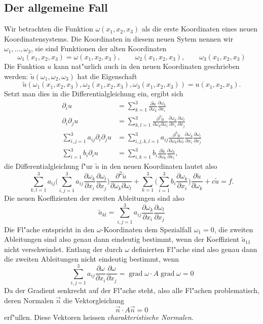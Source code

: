 \subsection{Der allgemeine Fall}
Wir betrachten die Funktion $\omega(x_1,x_2,x_3)$ als die erste
Koordinaten eines neuen Koordinatensystems. Die Koordinaten in diesem
neuen Sytem nennen wir $\omega_1,\dots,\omega_3$, sie sind Funktionen
der alten Koordinaten
\[
\omega_1(x_1,x_2,x_3)=\omega(x_1,x_2,x_3)
,\qquad
\omega_2(x_1,x_2,x_3)
,\qquad
\omega_3(x_1,x_2,x_3)
\]
Die Funktion $u$ kann nat"urlich auch in den neuen Koordinaten geschrieben
werden: $\tilde u(\omega_1,\omega_2,\omega_3)$ hat die Eigenschaft
\[
\tilde u(
\omega_1(x_1,x_2,x_3),
\omega_2(x_1,x_2,x_3),
\omega_3(x_1,x_2,x_3)) = u(x_1,x_2,x_3).
\]
Setzt man dies in die Differentialgleichung ein, ergibt sich
\begin{align*}
\partial_iu
&=
\sum_{k=1}^3
\frac{\partial\tilde u}{\partial \omega_k}
\frac{\partial\omega_k}{\partial x_i}
\\
\partial_i\partial_ju
&=
\sum_{k,l=1}^3
\frac{\partial^2\tilde u}{\partial \omega_k\partial\omega_l}
\frac{\partial\omega_k}{\partial x_i}
\frac{\partial\omega_l}{\partial x_j}
\\
\sum_{i,j=1}^3a_{ij}\partial_i\partial_ju
&=
\sum_{i,j,k,l=1}^3a_{ij}
\frac{\partial^2\tilde u}{\partial \omega_k\partial\omega_l}
\frac{\partial\omega_k}{\partial x_i}
\frac{\partial\omega_l}{\partial x_j}
\\
\sum_{i=1}^3b_i\partial_iu
&=
\sum_{i,k=1}^3b_i
\frac{\partial\tilde u}{\partial \omega_k}
\frac{\partial\omega_k}{\partial x_i},
\end{align*}
die Differentialgleichung f"ur $\tilde u$ in den neuen 
Koordinaten lautet also
\[
\sum_{k,l=1}^3a_{ij}
\biggl(
\sum_{i,j=1}^3a_{ij}
\frac{\partial\omega_k}{\partial x_i}
\frac{\partial\omega_l}{\partial x_j}
\biggr)
\frac{\partial^2\tilde u}{\partial \omega_k\partial\omega_l}
+
\sum_{k=1}^3
\biggl(
\sum_{i=1}^3
b_i
\frac{\partial\omega_k}{\partial x_i}
\biggr)
\frac{\partial\tilde u}{\partial \omega_k}
+c\tilde u
=f.
\]
Die neuen Koeffizienten der zweiten Ableitungen sind also
\[
\tilde a_{kl}=
\sum_{i,j=1}^3a_{ij}
\frac{\partial\omega_k}{\partial x_i}
\frac{\partial\omega_l}{\partial x_j}
\]
Die Fl"ache entspricht in den $\omega$-Koordinaten dem Spezialfall $\omega_1=0$,
die zweiten Ableitungen sind also genau dann eindeutig bestimmt, wenn
der Koeffizient $\tilde a_{11}$ nicht verschwindet. Entlang der durch $\omega$
definierten Fl"ache sind also genau dann die zweiten Ableitungen nicht eindeutig
bestimmt, wenn 
\[
\sum_{i,j=1}^3
a_{ij}
\frac{\partial\omega}{\partial x_i}
\frac{\partial\omega}{\partial x_j}
=
\operatorname{grad}\omega
\cdot
A
\operatorname{grad}\omega
=0
\]
Da der Gradient senkrecht auf der Fl"ache steht, also alle Fl"achen
problematisch, deren Normalen $\vec n$ die Vektorgleichung
\[
\vec n\cdot A\vec n=0
\]
erf"ullen. Diese Vektoren heissen {\it charakteristische Normalen}.

